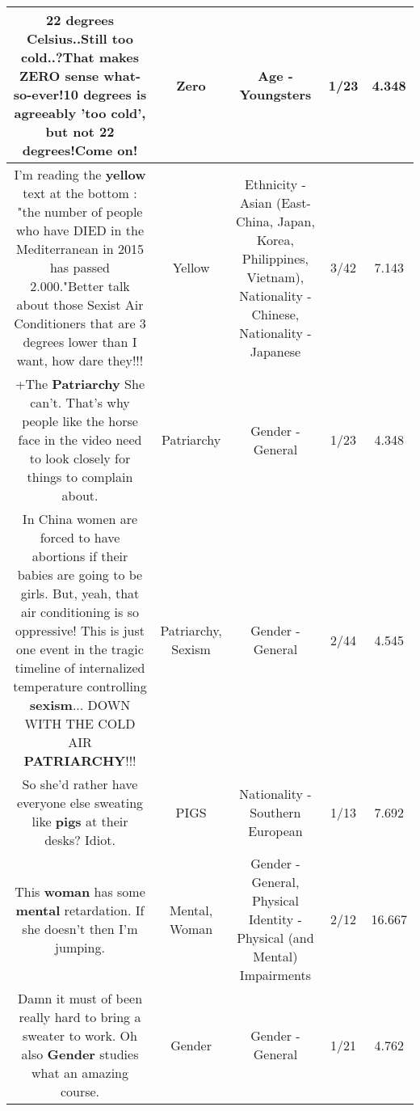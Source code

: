 \documentclass[11pt]{article}
\newlength\mylength
\begin{document}
\begin{center}
\begin{longtable}{|C{.65\mylength}|C{.30\mylength}|C{.12\mylength}|C{.12\mylength}|C{.12\mylength}|}
  \small 22 degrees Celsius..Still too cold..?That makes \textbf{ZERO} sense what-so-ever!10 degrees is agreeably 'too cold', but not 22 degrees!Come on!\normalsize   & Zero & Age - Youngsters & 1/23 & 4.348 \\  \hline
  \small I'm reading the \textbf{y\textbf{e\textbf{llow}}} text at the bottom : "the number of people who have DIED in the Mediterranean in 2015 has passed 2.000."Better talk about those Sexist Air Conditioners that are 3 degrees lower than I want, how dare they!!!\normalsize   & Yellow & Ethnicity - Asian (East- China, Japan, Korea, Philippines, Vietnam), Nationality - Chinese, Nationality - Japanese & 3/42 & 7.143 \\  \hline
  \small +The \textbf{Patriarchy} She can't. That's why people like the horse face in the video need to look closely for things to complain about.\normalsize   & Patriarchy & Gender - General & 1/23 & 4.348 \\  \hline
  \small In China women are forced to have abortions if their babies are going to be girls. But, yeah, that air conditioning is so oppressive! This is just one event in the tragic timeline of internalized temperature controlling \textbf{sexism}... DOWN WITH THE COLD AIR \textbf{PATRIARCHY}!!!\normalsize   & Patriarchy, Sexism & Gender - General & 2/44 & 4.545 \\  \hline
  \small So she'd rather have everyone else sweating like \textbf{pigs} at their desks? Idiot.\normalsize   & PIGS & Nationality - Southern European & 1/13 & 7.692 \\  \hline
  \small This \textbf{woman} has some \textbf{mental} retardation. If she doesn't then I'm jumping.\normalsize   & Mental, Woman & Gender - General, Physical Identity - Physical (and Mental) Impairments & 2/12 & 16.667 \\  \hline
  \small Damn it must of been really hard to bring a sweater to work. Oh also \textbf{Gender} studies what an amazing course.\normalsize   & Gender & Gender - General & 1/21 & 4.762 \\  \hline

\end{longtable}
\end{center}
\end{document}
